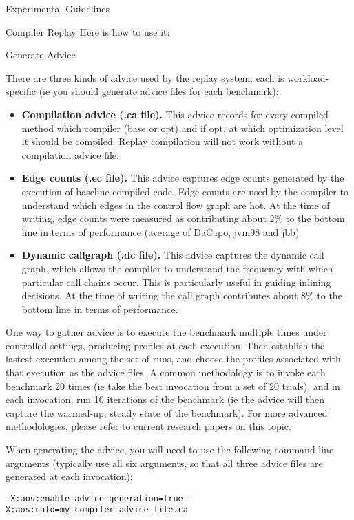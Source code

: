 \begin{chapter}{Experimental Guidelines}
\begin{section}{Compiler Replay}
Here is how to use it:

\begin{subsection}{Generate Advice}

There are three kinds of advice used by the replay system, each is workload-specific (ie you should generate advice files for each benchmark):
\begin{itemize}
  \item \textbf{Compilation advice (.ca file).} This advice records for every compiled method which compiler (base or opt) and if opt, at which optimization level it should be compiled.  Replay compilation will not work without a compilation advice file.
  \item \textbf{Edge counts (.ec file).} This advice captures edge counts generated by the execution of baseline-compiled code.   Edge counts are used by the compiler to understand which edges in the control flow graph are hot.   At the time of writing, edge counts were measured as contributing about 2\% to the bottom line in terms of performance (average of DaCapo, jvm98 and jbb)
  \item \textbf{Dynamic callgraph (.dc file).}  This advice captures the dynamic call graph, which allows the compiler to understand the frequency with which particular call chains occur.  This is particularly useful in guiding inlining decisions.  At the time of writing the call graph contributes about 8\% to the bottom line in terms of performance.
\end{itemize}


One way to gather advice is to execute the benchmark multiple times under controlled settings, producing profiles at each execution.   Then establish the fastest execution among the set of runs, and choose the profiles associated with that execution as the advice files.   A common methodology is to invoke each benchmark 20 times (ie take the best invocation from a set of 20 trials), and in each invocation, run 10 iterations of the benchmark (ie the advice will then capture the warmed-up, steady state of the benchmark). For more advanced methodologies, please refer to current research papers on this topic.

When generating the advice, you will need to use the following command line arguments (typically use all six arguments, so that all three advice files are generated at each invocation):

\begin{lstlisting}[title=For adaptive compilation profile]
-X:aos:enable_advice_generation=true -X:aos:cafo=my_compiler_advice_file.ca
\end{lstlisting}


\end{subsection}
\end{section}
\end{chapter}
